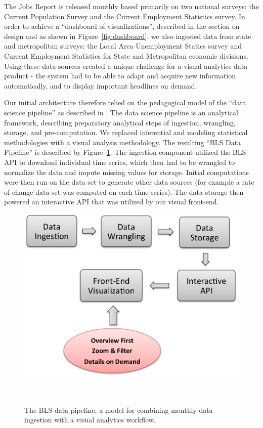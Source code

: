 \documentclass[journal]{IEEEtran}
\newcommand\Ben[1]{{\color{blue}#1}}		%
\begin{document}
\Ben{The Jobs Report is released monthly based primarily on two national surveys: the Current Population Survey and the Current Employment Statistics survey. In order to achieve a ``dashboard of visualizations'', described in the section on design and as shown in Figure~\ref{fig:dashboard}, we also ingested data from state and metropolitan surveys: the Local Area Unemployment Statics survey and Current Employment Statistics for State and Metropolitan economic divisions. Using these data sources created a unique challenge for a visual analytics data product - the system had to be able to adapt and acquire new information automatically, and to display important headlines on demand.

Our initial architecture therefore relied on the pedagogical model of the ``data science pipeline'' as described in \cite{ojeda_practical_2014}. The data science pipeline is an analytical framework, describing preparatory analytical steps of ingestion, wrangling, storage, and pre-computation. We replaced inferential and modeling statistical methodologies with a visual analysis methodology. The resulting ``BLS Data Pipeline'' is described by Figure~\ref{fig:pipline}. The ingestion component utilized the BLS API to download individual time series, which then had to be wrangled to normalize the data and impute missing values for storage. Initial computations were then run on the data set to generate other data sources (for example a rate of change data set was computed on each time series). The data storage then powered an interactive API that was utilized by our visual front-end.

\begin{figure}[!h]
    \centering
    \includegraphics[width=0.9\columnwidth]{BensFigures/pipeline.png}
    \caption{The BLS data pipeline, a model for combining monthly data ingestion with a visual analytics workflow.}~\label{fig:pipline}
\end{figure}

}
\end{document}
